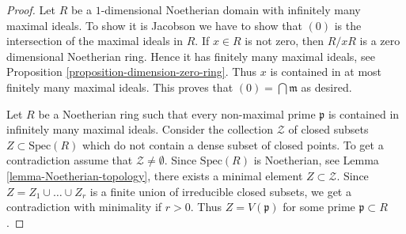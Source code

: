 \begin{proof}
Let $R$ be a $1$-dimensional Noetherian domain with
infinitely many maximal ideals. To show it is Jacobson
we have to show that $(0)$ is the intersection of
the maximal ideals in $R$.
If $x \in R$ is not zero, then $R/xR$ is
a zero dimensional Noetherian ring.
Hence it has finitely many
maximal ideals, see Proposition \ref{proposition-dimension-zero-ring}. Thus
$x$ is contained in at most finitely many maximal ideals.
This proves that $(0) = \bigcap \mathfrak m$ as desired.

\medskip\noindent
Let $R$ be a Noetherian ring such that
every non-maximal prime $\mathfrak p$ is contained
in infinitely many maximal ideals. Consider the
collection $\mathcal{Z}$ of closed subsets $Z \subset \text{Spec}(R)$
which do not contain a dense subset of closed points.
To get a contradiction assume that $\mathcal{Z} \not = \emptyset$.
Since $\text{Spec}(R)$ is Noetherian, see
Lemma \ref{lemma-Noetherian-topology}, there exists a
minimal element $Z \subset \mathcal{Z}$. Since
$Z = Z_1 \cup \ldots \cup Z_r$ is a finite union
of irreducible closed subsets, we get a contradiction
with minimality if $r > 0$. Thus $Z = V(\mathfrak p)$
for some prime $\mathfrak p \subset R$.


\end{proof}

